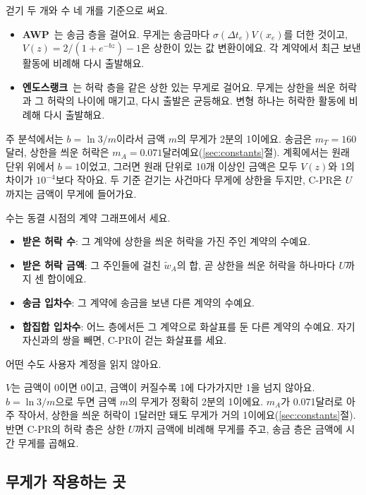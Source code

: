걷기 두 개와 수 네 개를 기준으로 써요.
\begin{itemize}
\item \textbf{AWP}~\cite{do2023awp}는 송금 층을 걸어요. 무게는 송금마다 $\sigma(\Delta t_e)V(x_e)$를 더한 것이고, $V(z)=2/(1+e^{-bz})-1$은 상한이 있는 값 변환이에요. 각 계약에서 최근 보낸 활동에 비례해 다시 출발해요.
\item \textbf{엔도스랭크}~\cite{kwon2026companion}는 허락 층을 같은 상한 있는 무게로 걸어요. 무게는 상한을 씌운 허락과 그 허락의 나이에 매기고, 다시 출발은 균등해요. 변형 하나는 허락한 활동에 비례해 다시 출발해요.
\end{itemize}
주 분석에서는 $b=\ln 3/m$이라서 금액 $m$의 무게가 2분의 1이에요. 송금은 $m_T=160$달러, 상한을 씌운 허락은 $m_A=0.071$달러예요(\ref{sec:constants}절). 계획에서는 원래 단위 위에서 $b=1$이었고, 그러면 원래 단위로 10개 이상인 금액은 모두 $V(z)$와 1의 차이가 $10^{-4}$보다 작아요. 두 기준 걷기는 사건마다 무게에 상한을 두지만, C-PR은 $U$까지는 금액이 무게에 들어가요.

수는 동결 시점의 계약 그래프에서 세요.
\begin{itemize}
\item \textbf{받은 허락 수}: 그 계약에 상한을 씌운 허락을 가진 주인 계약의 수예요.
\item \textbf{받은 허락 금액}: 그 주인들에 걸친 $\tilde w_A$의 합, 곧 상한을 씌운 허락을 하나마다 $U$까지 센 합이에요.
\item \textbf{송금 입차수}: 그 계약에 송금을 보낸 다른 계약의 수예요.
\item \textbf{합집합 입차수}: 어느 층에서든 그 계약으로 화살표를 둔 다른 계약의 수예요. 자기 자신과의 쌍을 빼면, C-PR이 걷는 화살표를 세요.
\end{itemize}
어떤 수도 사용자 계정을 읽지 않아요.

\begin{puri}
$V$는 금액이 0이면 0이고, 금액이 커질수록 1에 다가가지만 1을 넘지 않아요. $b=\ln 3/m$으로 두면 금액 $m$의 무게가 정확히 2분의 1이에요. $m_A$가 0.071달러로 아주 작아서, 상한을 씌운 허락이 1달러만 돼도 무게가 거의 1이에요(\ref{sec:constants}절). 반면 C-PR의 허락 층은 상한 $U$까지 금액에 비례해 무게를 주고, 송금 층은 금액에 시간 무게를 곱해요.
\end{puri}

\subsection{무게가 작용하는 곳}

